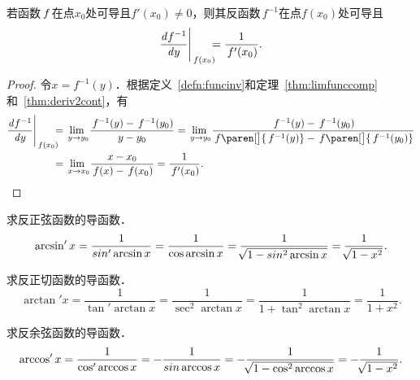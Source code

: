 \begin{theorem}
  \label{thm:derivinv}
  若函数\(\,f\mkern2mu\)在点\(x_0\)处可导且\(f'(x_0) \ne 0\)，则其反函数\(\,f^{-1}\)在点\(f(x_0)\)处可导且
  \begin{equation*}
    \dd[f^{-1}]y \Bigg\vert_{\,f(x_0)} \mkern-11mu = \frac1{\,f'(x_0)}.
  \end{equation*}

  \begin{proof}
    令\(x = f^{-1}(y)\)．根据定义~\ref{defn:funcinv}和定理~\ref{thm:limfunccomp}和~\ref{thm:deriv2cont}，有
    \begin{equation*}
      \begin{split}
        \dd[f^{-1}]y \Bigg\vert_{\,f(x_0)} \mkern-11mu
        &= \lim_{\,y\to y_0\!} \frac{\,f^{-1}(y) - \,f^{-1}(y_0)}{y - y_0}
        = \lim_{\,y\to y_0\!} \frac{\,f^{-1}(y) - \,f^{-1}(y_0)}{\,f\paren[\big]{\,f^{-1}(y)} - \,f\paren[\big]{\,f^{-1}(y_0)}} \\
        &= \lim_{\,x\to x_0\!} \frac{x - x_0}{\,f(x) - \,f(x_0)}
        = \frac{1}{\,f'(x_0)}.
        \qedhere
      \end{split}
    \end{equation*}
  \end{proof}
\end{theorem}

\begin{example*}
  求反正弦函数的导函数．
  \begin{equation*}
    \arcsin'x
    = \frac1{\sin'\arcsin x}
    = \frac1{\cos\arcsin x}
    = \frac1{\negthickspace\sqrt{1 - \sin^2\arcsin x}}
    = \frac1{\negthickspace\sqrt{1 - x^2}}.
  \end{equation*}
\end{example*}

\begin{example*}
  求反正切函数的导函数．
  \begin{equation*}
    \arctan'x
    = \frac1{\tan'\arctan x}
    = \frac1{\sec^2\arctan x}
    = \frac1{1 + \tan^2\arctan x}
    = \frac1{1 + x^2}.
  \end{equation*}
\end{example*}

\begin{example*}
  求反余弦函数的导函数．
  \begin{equation*}
    \arccos'x
    = \frac1{\cos'\arccos x}
    = - \frac1{\sin\arccos x}
    = - \frac1{\negthickspace\sqrt{1 - \cos^2\arccos x}}
    = - \frac1{\negthickspace\sqrt{1 - x^2}}.
  \end{equation*}
\end{example*}

